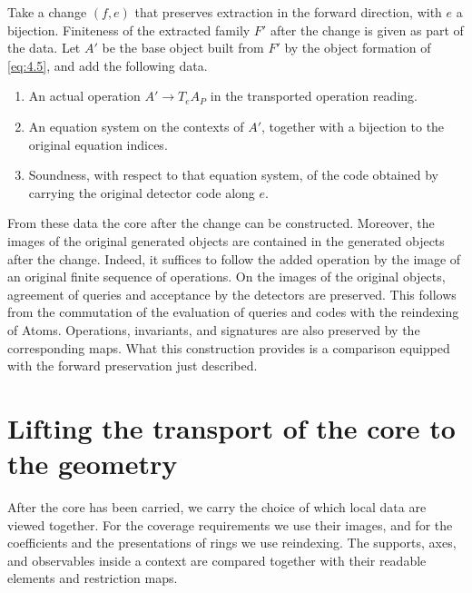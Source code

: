 \begin{construction}\label{cons:4.7}

Take a change $(f,e)$ that preserves extraction in the forward direction, with $e$ a
bijection.
Finiteness of the extracted family $F'$ after the change is given as part of the data.
Let $A'$ be the base object built from $F'$ by the object formation of \eqref{eq:4.5}, and
add the following data.

\begin{enumerate}
\item An actual operation $A'\to T_eA_P$ in the transported operation reading.
\item An equation system on the contexts of $A'$, together with a bijection to the original
equation indices.
\item Soundness, with respect to that equation system, of the code obtained by carrying the
original detector code along $e$.
\end{enumerate}

From these data the core after the change can be constructed.
Moreover, the images of the original generated objects are contained in the generated
objects after the change.
Indeed, it suffices to follow the added operation by the image of an original finite
sequence of operations.
On the images of the original objects, agreement of queries and acceptance by the
detectors are preserved.
This follows from the commutation of the evaluation of queries and codes with the
reindexing of Atoms.
Operations, invariants, and signatures are also preserved by the corresponding maps.
What this construction provides is a comparison equipped with the forward preservation
just described.

\end{construction}

\section{Lifting the transport of the core to the geometry}\label{sec:4.3}

After the core has been carried, we carry the choice of which local data are viewed
together. For the coverage requirements we use their images, and for the coefficients and
the presentations of rings we use reindexing. The supports, axes, and observables inside a
context are compared together with their readable elements and restriction maps.

